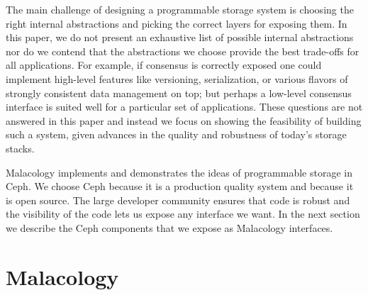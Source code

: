 \documentclass[preprint]{sigplanconf-eurosys}
\begin{document}
The main challenge of designing a programmable storage system is choosing the
right internal abstractions and picking the correct layers for exposing them.
In this paper, we do not present an exhaustive list of possible internal
abstractions nor do we contend that the abstractions we choose provide the best
trade-offs for all applications.
For example, if consensus is correctly exposed one could implement
high-level features like versioning, serialization, or various flavors
of strongly consistent data management on top; but perhaps a low-level
consensus interface is suited well for a particular set of applications.
These questions are not answered in
this paper and instead we focus on showing the feasibility of building such a
system, given advances in the quality and robustness of today's storage stacks.

Malacology implements and demonstrates the ideas of programmable storage in
Ceph. We choose Ceph because it is a production quality system and because it
is open source. The large developer community ensures that code is
robust and the visibility of the code lets us expose any interface we want. In
the next section we describe the Ceph components that we expose as Malacology
interfaces.

\section{Malacology}
\label{sec:malacology}
\end{document}
